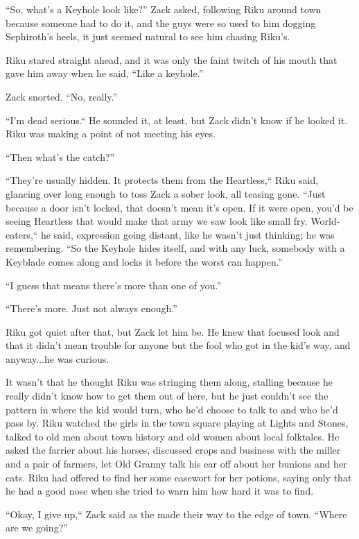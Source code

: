\scenechange


``So, what's a Keyhole look like?'' Zack asked, following Riku around town because someone had to do it, and the guys were so used to him dogging Sephiroth's heels, it just seemed natural to see him chasing Riku's.

Riku stared straight ahead, and it was only the faint twitch of his mouth that gave him away when he said, ``Like a keyhole.''

Zack snorted. ``No, really.''

``I'm dead serious.`` He sounded it, at least, but Zack didn't know if he looked it. Riku was making a point of not meeting his eyes.

``Then what's the catch?''

``They're usually hidden. It protects them from the Heartless,`` Riku said, glancing over long enough to toss Zack a sober look, all teasing gone. ``Just because a door isn't locked, that doesn't mean it's open. If it were open, you'd be seeing Heartless that would make that army we saw look like small fry. World-eaters,`` he said, expression going distant, like he wasn't just thinking; he was remembering. ``So the Keyhole hides itself, and with any luck, somebody with a Keyblade comes along and locks it before the worst can happen.''

``I guess that means there's more than one of you.''

``There's more. Just not always enough.''

Riku got quiet after that, but Zack let him be. He knew that focused look and that it didn't mean trouble for anyone but the fool who got in the kid's way, and anyway...he was curious.

It wasn't that he thought Riku was stringing them along, stalling because he really didn't know how to get them out of here, but he just couldn't see the pattern in where the kid would turn, who he'd choose to talk to and who he'd pass by. Riku watched the girls in the town square playing at Lights and Stones, talked to old men about town history and old women about local folktales. He asked the farrier about his horses, discussed crops and business with the miller and a pair of farmers, let Old Granny talk his ear off about her bunions and her cats. Riku had offered to find her some easewort for her potions, saying only that he had a good nose when she tried to warn him how hard it was to find.

``Okay, I give up,`` Zack said as the made their way to the edge of town. ``Where are we going?''

